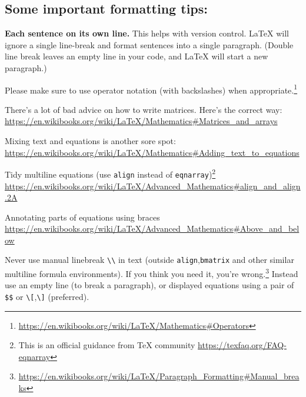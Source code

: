\documentclass{amsart}
\begin{document}
 \subsection{Some \textbf{important formatting tips}:}
 \begin{compactitem}
 \item \textbf{Each sentence on its own line.} This helps with version control. LaTeX will ignore a single line-break and format sentences into a single paragraph. (Double line break leaves an empty line in your code, and LaTeX will start a new paragraph.)
\item Please make sure to use operator notation (with backslashes) when appropriate.\footnote{\url{https://en.wikibooks.org/wiki/LaTeX/Mathematics\#Operators}}
\item There's a lot of bad advice on how to write matrices. Here's the correct way: \url{https://en.wikibooks.org/wiki/LaTeX/Mathematics\#Matrices_and_arrays}
\item Mixing text and equations is another sore spot: \url{https://en.wikibooks.org/wiki/LaTeX/Mathematics\#Adding_text_to_equations}
\item Tidy multiline equations (use \verb|align| instead of \verb|eqnarray|)\footnote{This is an official guidance from TeX community \url{https://texfaq.org/FAQ-eqnarray}} \url{https://en.wikibooks.org/wiki/LaTeX/Advanced_Mathematics\#align_and_align.2A}
\item Annotating parts of equations using braces \url{https://en.wikibooks.org/wiki/LaTeX/Advanced_Mathematics\#Above_and_below}
\item Never use manual linebreak \verb|\\| in text (outside \verb|align|,\verb|bmatrix| and other similar multiline formula environments). If you think you need it, you're wrong.\footnote{\url{https://en.wikibooks.org/wiki/LaTeX/Paragraph_Formatting\#Manual_breaks}} Instead use an empty line (to break a paragraph), or displayed equations using a pair of \verb|$$| or \verb|\[|,\verb|\]| (preferred).
\end{compactitem}
\end{document}
